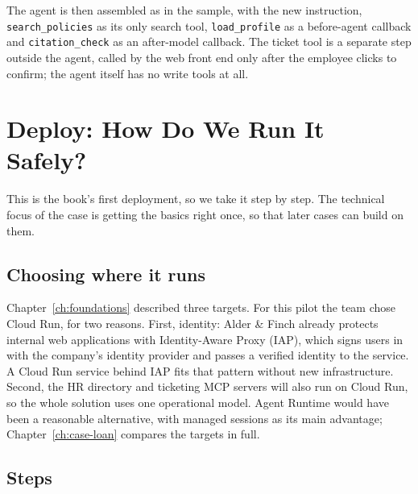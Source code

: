 The agent is then assembled as in the sample, with the new instruction, \texttt{search\_policies} as its only search tool, \texttt{load\_profile} as a before-agent callback and \texttt{citation\_check} as an after-model callback. The ticket tool is a separate step outside the agent, called by the web front end only after the employee clicks to confirm; the agent itself has no write tools at all.

\section{Deploy: How Do We Run It Safely?}
\label{sec:policy-deploy}

This is the book's first deployment, so we take it step by step. The technical focus of the case is getting the basics right once, so that later cases can build on them.

\subsection{Choosing where it runs}

Chapter~\ref{ch:foundations} described three targets. For this pilot the team chose Cloud Run, for two reasons. First, identity: Alder \& Finch already protects internal web applications with Identity-Aware Proxy (IAP), which signs users in with the company's identity provider and passes a verified identity to the service. A Cloud Run service behind IAP fits that pattern without new infrastructure. Second, the HR directory and ticketing MCP servers will also run on Cloud Run, so the whole solution uses one operational model. Agent Runtime would have been a reasonable alternative, with managed sessions as its main advantage; Chapter~\ref{ch:case-loan} compares the targets in full.

\subsection{Steps}

